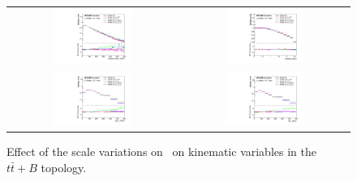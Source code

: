 \begin{figure}[p]
\begin{center}
\begin{tabular}{cc}
\includegraphics[width=0.48\textwidth]{Modeling/Figures/scales_tt1gbbq_q1_pt_norm} &
\includegraphics[width=0.48\textwidth]{Modeling/Figures/scales_tt1gbbq_q1_eta_norm} \\
\includegraphics[width=0.48\textwidth]{Modeling/Figures/scales_tt1gbbq_top_pt_norm} &
\includegraphics[width=0.48\textwidth]{Modeling/Figures/scales_tt1gbbq_ttbar_pt_norm} \\
\end{tabular}
\caption{Effect of the scale variations  on \ShOL\ on kinematic variables in the $t\bar{t}+B$ topology.}
\label{fig:scales_tt1gbb}
\end{center}
\end{figure}
